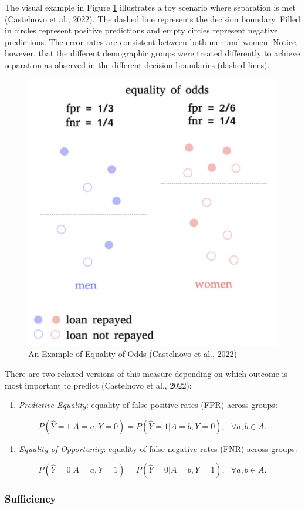 \documentclass[12pt, twoside]{amherstthesis}
\providecommand{\tightlist}{%
  \setlength{\itemsep}{0pt}\setlength{\parskip}{0pt}}
\begin{document}
The visual example in Figure \ref{fig:eoo} illustrates a toy scenario where separation is met (Castelnovo et al., 2022). The dashed line represents the decision boundary. Filled in circles represent positive predictions and empty circles represent negative predictions. The error rates are consistent between both men and women. Notice, however, that the different demographic groups were treated differently to achieve separation as observed in the different decision boundaries (dashed lines).
\begin{figure}

{\centering \includegraphics[width=0.6\linewidth]{figures/eoo} 

}

\caption[An Example of Equality of Odds]{An Example of Equality of Odds (Castelnovo et al., 2022)}\label{fig:eoo}
\end{figure}
There are two relaxed versions of this measure depending on which outcome is most important to predict (Castelnovo et al., 2022):
\begin{enumerate}
\def\labelenumi{\roman{enumi})}
\tightlist
\item
  \emph{Predictive Equality}: equality of false positive rates (FPR) across groups:
\end{enumerate}
\begin{equation}
\label{ch1eq9}
P (\hat{Y} = 1 | A = a, Y = 0) = P (\hat{Y} = 1 | A = b, Y = 0), \text{ } \forall a,b \in A.
\end{equation}
\begin{enumerate}
\def\labelenumi{\roman{enumi})}
\setcounter{enumi}{1}
\tightlist
\item
  \emph{Equality of Opportunity}: equality of false negative rates (FNR) across groups:
\end{enumerate}
\begin{equation}
\label{ch1eq10}
P (\hat{Y} = 0 | A = a, Y = 1) = P (\hat{Y} = 0 | A = b, Y = 1), \text{ } \forall a,b \in A.
\end{equation}
\hypertarget{sufficiency}{%
\subsubsection{Sufficiency}\label{sufficiency}}
\end{document}
